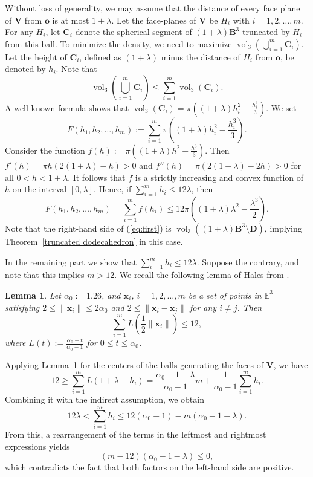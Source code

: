 \documentclass[11pt]{amsart}
\DeclareMathOperator{\vol}{vol}
\newcommand{\Eu}{\mathbb{E}}
\newcommand{\BB}{\mathbf{B}}
\newcommand{\x}{\mathbf{x}}
\newcommand{\VV}{\mathbf{V}}
\newcommand{\CC}{\mathbf{C}}
\newcommand{\DD}{\mathbf{D}}
\renewcommand{\o}{\mathbf{o}}
\newtheorem{lemma}[theorem]{Lemma}
\theoremstyle{definition}
\numberwithin{equation}{section}
\begin{document}
Without loss of generality, we may assume that the distance of every face plane of $\VV$ from $\o$ is at most $1+\lambda$.
Let the face-planes of $\VV$ be $H_i$ with $i=1,2,\ldots, m$. For any $H_i$, let $\CC_i$ denote the spherical segment of $(1+\lambda) \BB^3$ truncated by $H_i$ from this ball.
To minimize the density, we need to maximize $\vol_3 \left( \bigcup_{i=1}^m \CC_i \right)$. Let the height of $\CC_i$, defined as $(1+\lambda)$ minus the distance of $H_i$ from $\o$, be denoted by $h_i$.
Note that 
\[
\vol_3 \left( \bigcup_{i=1}^m \CC_i \right) \leq \sum_{i=1}^m \vol_3(\CC_i).
\]
A well-known formula shows that $\vol_3(\CC_i) = \pi \left( (1+\lambda) h_i^2 - \frac{h_i^3}{3} \right)$. We set
\[
F(h_1,h_2,\ldots, h_m) := \sum_{i=1}^m \pi \left( (1+\lambda) h_i^2 - \frac{h_i^3}{3} \right).
\]
Consider the function $f(h) := \pi \left( (1+\lambda) h^2 - \frac{h^3}{3} \right)$. Then $f'(h)=\pi h(2(1+\lambda)-h)>0$ and $f''(h) = \pi (2(1+\lambda)-2h)>0$ for all $0<h<1+\lambda$. It follows that $f$ is a
strictly increasing and convex function of $h$ on the interval $[0,\lambda]$.
Hence, if $\sum_{i=1}^m h_i \leq 12 \lambda$, then
\begin{equation}\label{eq:first}
F(h_1,h_2,\ldots, h_m)=\sum_{i=1}^m f(h_i)  \leq 12 \pi \left( (1+\lambda) \lambda^2 - \frac{\lambda^3}{2} \right).
\end{equation}
Note that the right-hand side of (\ref{eq:first}) is $\vol_3 ((1+\lambda) \BB^3 \setminus \DD)$, implying Theorem~\ref{truncated dodecahedron} in this case.

In the remaining part we show that $\sum_{i=1}^m h_i \leq 12 \lambda$. Suppose the contrary, and note that this implies $m > 12$. We recall the following lemma of Hales from \cite{L-12}.

\begin{lemma}\label{lem:Hales}
Let $\alpha_0 := 1.26$, and $\x_i$, $i=1,2,\ldots, m$ be a set of points in $\Eu^3$ satisfying $2 \leq \| \x_i \| \leq 2 \alpha_0$ and $2 \leq \| \x_i - \x_j \|$ for any $i \neq j$.
Then
\[
\sum_{i=1}^m L \left( \frac{1}{2} \| \x_i \| \right) \leq 12,
\]
where $L(t) := \frac{\alpha_0-t}{\alpha_0-1}$ for $0\leq t\leq\alpha_0$.
\end{lemma}

Applying Lemma~\ref{lem:Hales} for the centers of the balls generating the faces of $\VV$, we have
\[
12 \geq \sum_{i=1}^m L(1+\lambda-h_i) = \frac{\alpha_0-1-\lambda}{\alpha_0-1} m +\frac{1}{\alpha_0-1} \sum_{i=1}^m h_i.
\]
Combining it with the indirect assumption, we obtain
\begin{equation}\label{eq:estimate1}
12 \lambda < \sum_{i=1}^m h_i \leq 12 (\alpha_0-1)-m(\alpha_0-1-\lambda).
\end{equation}
From this, a rearrangement of the terms in the leftmost and rightmost expressions yields
\[
(m-12)(\alpha_0-1-\lambda) \leq 0,
\]
which contradicts the fact that both factors on the left-hand side are positive.
\end{document}
